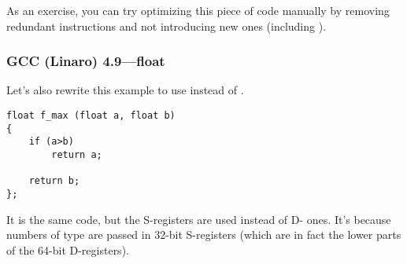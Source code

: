 \myparagraph{\Exercise}

As an exercise, you can try optimizing this piece of code 
manually by removing redundant instructions and not introducing new ones (including ).

\subsubsection{\Optimizing GCC (Linaro) 4.9---float}

Let's also rewrite this example to use \Tfloat instead of \Tdouble.

\begin{lstlisting}
float f_max (float a, float b)
{
	if (a>b)
		return a;

	return b;
};
\end{lstlisting}



It is the same code, but the S-registers are used instead of D- ones.
It's because numbers of type \Tfloat are passed in 32-bit S-registers (which are in fact the lower parts of the 64-bit D-registers).

